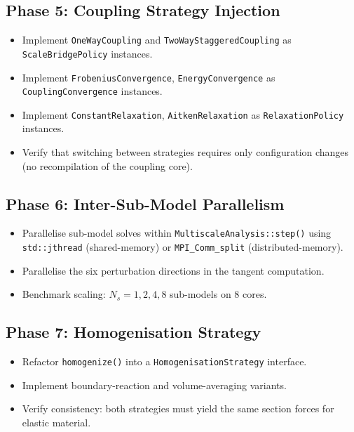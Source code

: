 \subsection{Phase 5: Coupling Strategy Injection}
\label{sec:ms-plan-phase5}

\begin{itemize}
  \item Implement \texttt{OneWayCoupling} and
    \texttt{TwoWayStaggeredCoupling} as
    \texttt{ScaleBridgePolicy} instances.
  \item Implement \texttt{FrobeniusConvergence},
    \texttt{EnergyConvergence} as
    \texttt{CouplingConvergence} instances.
  \item Implement \texttt{ConstantRelaxation},
    \texttt{AitkenRelaxation} as
    \texttt{RelaxationPolicy} instances.
  \item Verify that switching between strategies requires only
    configuration changes (no recompilation of the coupling core).
\end{itemize}

\subsection{Phase 6: Inter-Sub-Model Parallelism}
\label{sec:ms-plan-phase6}

\begin{itemize}
  \item Parallelise sub-model solves within
    \texttt{MultiscaleAnalysis::step()} using \texttt{std::jthread}
    (shared-memory) or \texttt{MPI\_Comm\_split}
    (distributed-memory).
  \item Parallelise the six perturbation directions in the tangent
    computation.
  \item Benchmark scaling: $N_s = 1, 2, 4, 8$ sub-models on 8
    cores.
\end{itemize}

\subsection{Phase 7: Homogenisation Strategy}
\label{sec:ms-plan-phase7}

\begin{itemize}
  \item Refactor \texttt{homogenize()} into a
    \texttt{HomogenisationStrategy} interface.
  \item Implement boundary-reaction and volume-averaging variants.
  \item Verify consistency: both strategies must yield the same
    section forces for elastic material.
\end{itemize}

